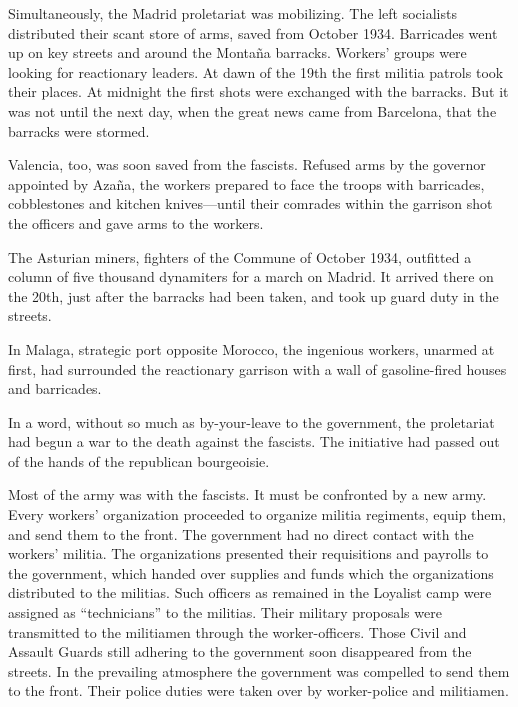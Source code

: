Simultaneously, the Madrid proletariat was mobilizing. The left socialists distributed their scant store of arms, saved from October 1934. Barricades went up on key streets and around the Montaña barracks. Workers’ groups were looking for reactionary leaders. At dawn of the 19th the first militia patrols took their places. At midnight the first shots were exchanged with the barracks. But it was not until the next day, when the great news came from Barcelona, that the barracks were stormed.

Valencia, too, was soon saved from the fascists. Refused arms by the governor appointed by Azaña, the workers prepared to face the troops with barricades, cobblestones and kitchen knives---until their comrades within the garrison shot the officers and gave arms to the workers.

The Asturian miners, fighters of the Commune of October 1934, outfitted a column of five thousand dynamiters for a march on Ma\-drid. It arrived there on the 20th, just after the barracks had been taken, and took up guard duty in the streets.
\nowidow

In Malaga, strategic port opposite Morocco, the ingenious workers, unarmed at first, had surrounded the reactionary garrison with a wall of gasoline-fired houses and barricades.

In a word, without so much as by-your-leave to the government, the proletariat had begun a war to the death against the fascists. The initiative had passed out of the hands of the republican bourgeoisie.

Most of the army was with the fascists. It must be confronted by a new army. Every workers’ organization proceeded to organize militia regiments, equip them, and send them to the front. The government had no direct contact with the workers’ militia. The organizations presented their requisitions and payrolls to the government, which handed over supplies and funds which the organizations distributed to the militias. Such officers as remained in the Loyalist camp were assigned as ``technicians'' to the militias. Their military proposals were transmitted to the militiamen through the worker-officers. Those Civil and Assault Guards still adhering to the government soon disappeared from the streets. In the prevailing atmosphere the government was compelled to send them to the front. Their police duties were taken over by worker-police and militiamen.

